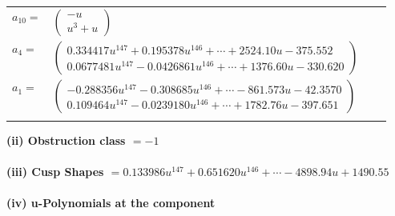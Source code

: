 \documentclass[1p]{elsarticle_modified}
\theoremstyle{definition}
\begin{document}
\begin{tabular}{m{7pt} m{180pt} m{7pt} m{180pt} }
\flushright $a_{10}=$&$\begin{pmatrix}- u\\u^3+u\end{pmatrix}$ \\
\flushright $a_{4}=$&$\begin{pmatrix}0.334417 u^{147}+0.195378 u^{146}+\cdots+2524.10 u-375.552\\0.0677481 u^{147}-0.0426861 u^{146}+\cdots+1376.60 u-330.620\end{pmatrix}$ \\
\flushright $a_{1}=$&$\begin{pmatrix}-0.288356 u^{147}-0.308685 u^{146}+\cdots-861.573 u-42.3570\\0.109464 u^{147}-0.0239180 u^{146}+\cdots+1782.76 u-397.651\end{pmatrix}$\\&\end{tabular}
\flushleft \textbf{(ii) Obstruction class $= -1$}\\~\\
\flushleft \textbf{(iii) Cusp Shapes $= 0.133986 u^{147}+0.651620 u^{146}+\cdots-4898.94 u+1490.55$}\\~\\
\newpage\renewcommand{\arraystretch}{1}
\flushleft \textbf{(iv) u-Polynomials at the component}\newline \\
\end{document}
